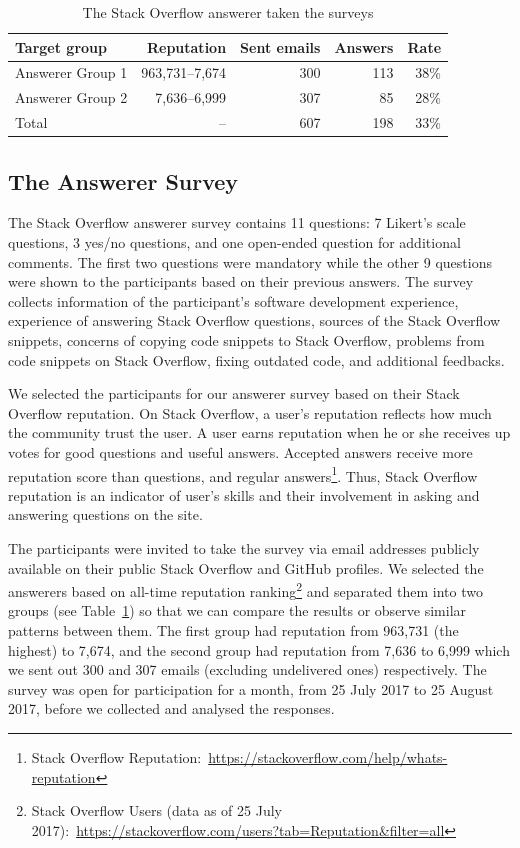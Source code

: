 \documentclass{svjour3}                     %
\begin{document}
\begin{table}
	\centering
	\caption{The Stack Overflow answerer taken the surveys}
	\label{tab:answerers}
	\begin{tabular}{lrrrr}
		\toprule
		Target group & Reputation & Sent emails & Answers & Rate \\
		\midrule
		Answerer Group 1 & 963,731--7,674 & 300 & 113 & 38\% \\
		Answerer Group 2 & 7,636--6,999 & 307 & 85 & 28\% \\
		\midrule
		Total & -- & 607 & 198 & 33\% \\
		\bottomrule
	\end{tabular}
\end{table}

\subsection{The Answerer Survey}
The Stack Overflow answerer survey contains 11 questions: 7 Likert's scale
questions, 3 yes/no questions, and one open-ended question for additional
comments. The first two questions were mandatory while the other 9 questions
were shown to the participants based on their previous answers. The survey collects
information of the participant's software development experience, experience of
answering Stack Overflow questions, sources of the Stack Overflow snippets,
concerns of copying code snippets to Stack Overflow, problems from code 
snippets on Stack Overflow, fixing outdated code, and additional feedbacks.

We selected the participants for our answerer survey based on their Stack Overflow reputation. On
Stack Overflow, a user's reputation reflects how much the community trust the
user. A user earns reputation when he or she receives up votes for good
questions and useful answers. Accepted answers receive more reputation score
than questions, and regular answers\footnote{Stack Overflow
	Reputation:~\url{https://stackoverflow.com/help/whats-reputation}}. Thus, Stack
Overflow reputation is an indicator of user's skills and their involvement in
asking and answering questions on the site.

The participants were invited to take the survey via email addresses publicly available on their
public Stack Overflow and GitHub profiles. We selected the answerers based on
all-time reputation ranking\footnote{Stack Overflow Users (data as of 25 July
	2017):~\url{https://stackoverflow.com/users?tab=Reputation&filter=all}} and
separated them into two groups (see Table~\ref{tab:answerers}) so that we can
compare the results or observe similar patterns between them. 
The first group had reputation from 963,731 (the
highest) to 7,674, and the second group had reputation from 7,636 to 6,999 which
we sent out 300 and 307 emails (excluding undelivered ones) respectively. The
survey was open for participation for a month, from 25 July 2017 to 25 August
2017, before we collected and analysed the responses.
\end{document}
